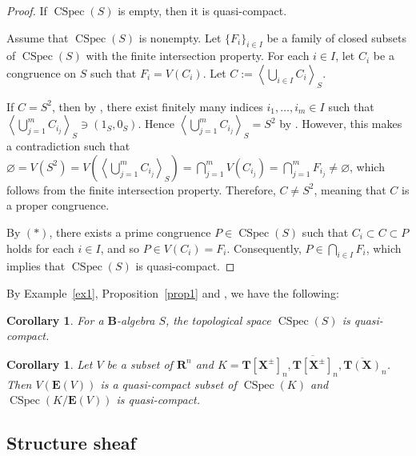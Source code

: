 \documentclass[a4paper,12pt]{amsart}
\theoremstyle{plain}
\newtheorem{corollary}[theorem]{Corollary}
\theoremstyle{definition}
\begin{document}
\begin{proof}
If $\operatorname{CSpec}(S)$ is empty, then it is quasi-compact.

Assume that $\operatorname{CSpec}(S)$ is nonempty.
Let $\{F_i\}_{i \in I}$ be a family of closed subsets of $\operatorname{CSpec}(S)$ with the finite intersection property. 
For each $i \in I$, let $C_i$ be a congruence on $S$ such that $F_i = V(C_i)$. 
Let $C := \left\langle \bigcup_{i \in I} C_{i} \right\rangle_S$.

If $C = S^2$, then by \cite[Lemma~2.1]{Nakajima=Song}, there exist finitely many indices $i_1, \dots, i_m \in I$ such that $\left\langle \bigcup_{j=1}^m C_{i_j} \right\rangle_S \ni (1_S, 0_S)$.
Hence $\left\langle \bigcup_{j=1}^m C_{i_j} \right\rangle_S = S^2$ by \cite[Lemma~3.3]{JuAe6}.
However, this makes a contradiction such that $\varnothing = V (S^2) = V\left( \left\langle \bigcup_{j=1}^m C_{i_j} \right\rangle_S \right) = \bigcap_{j = 1}^m V(C_{i_j}) = \bigcap_{j = 1}^m F_{i_j} \not= \varnothing$, which follows from the finite intersection property.
Therefore, $C \not= S^2$, meaning that $C$ is a proper congruence.

By $(\ast)$, there exists a prime congruence $P \in \operatorname{CSpec}(S)$ such that $C_{i} \subset C \subset P$ holds for each $i \in I$, and so $P \in V(C_{i}) = F_i$.
Consequently, $P \in \bigcap_{i \in I} F_i$, which implies that $\operatorname{CSpec}(S)$ is quasi-compact.
\end{proof}

By Example~\ref{ex1}, Proposition~\ref{prop1} and \cite[Proposition~2.8]{Tanaka}, we have the following:

\begin{corollary}
    \label{cor1}
For a $\boldsymbol{B}$-algebra $S$, the topological space $\operatorname{CSpec}(S)$ is quasi-compact.
\end{corollary}

\begin{corollary}
    \label{cor2}
Let $V$ be a subset of $\boldsymbol{R}^n$ and $K = \boldsymbol{T}[\boldsymbol{X}^{\pm}]_n, \overline{\boldsymbol{T}[\boldsymbol{X}^{\pm}]}_n, \overline{\boldsymbol{T}(\boldsymbol{X})}_n$.
Then $V(\boldsymbol{E}(V))$ is a quasi-compact subset of $\operatorname{CSpec}(K)$ and $\operatorname{CSpec}(K / \boldsymbol{E}(V))$ is quasi-compact.
\end{corollary}

\subsection{Structure sheaf}
    \label{subsection3.3}
\end{document}
